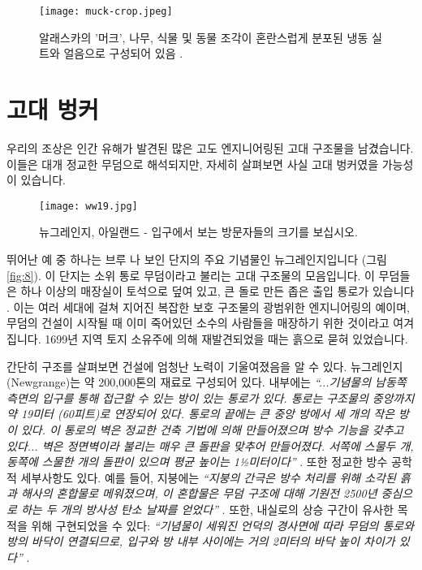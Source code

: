 \documentclass[10pt,twocolumn,letterpaper]{article}
\begin{document}
\begin{figure}[t]
\begin{center}
   \texttt{[image: muck-crop.jpeg]}
\end{center}
   \caption{알래스카의 '머크', 나무, 식물 및 동물 조각이 혼란스럽게 분포된 냉동 실트와 얼음으로 구성되어 있음 \cite{146}.}
\label{fig:7}
\label{fig:onecol}
\end{figure}

\section{고대 벙커}

우리의 조상은 인간 유해가 발견된 많은 고도 엔지니어링된 고대 구조물을 남겼습니다. 이들은 대개 정교한 무덤으로 해석되지만, 자세히 살펴보면 사실 고대 벙커였을 가능성이 있습니다.

\begin{figure}[b]
\begin{center}
   \texttt{[image: ww19.jpg]}
\end{center}
   \caption{뉴그레인지, 아일랜드 - 입구에서 보는 방문자들의 크기를 보십시오.}
\label{fig:8}
\label{fig:onecol}
\end{figure}

뛰어난 예 중 하나는 브루 나 보인 단지의 주요 기념물인 뉴그레인지입니다 (그림 \ref{fig:8}). 이 단지는 소위 통로 무덤이라고 불리는 고대 구조물의 모음입니다. 이 무덤들은 하나 이상의 매장실이 토석으로 덮여 있고, 큰 돌로 만든 좁은 출입 통로가 있습니다 \cite{70}. 이는 여러 세대에 걸쳐 지어진 복잡한 보호 구조물의 광범위한 엔지니어링의 예이며, 무덤의 건설이 시작될 때 이미 죽어있던 소수의 사람들을 매장하기 위한 것이라고 여겨집니다. 1699년 지역 토지 소유주에 의해 재발견되었을 때는 흙으로 묻혀 있었습니다.

간단히 구조를 살펴보면 건설에 엄청난 노력이 기울여졌음을 알 수 있다. 뉴그레인지(Newgrange)는 약 200,000톤의 재료로 구성되어 있다. 내부에는 \textit{“...기념물의 남동쪽 측면의 입구를 통해 접근할 수 있는 방이 있는 통로가 있다. 통로는 구조물의 중앙까지 약 19미터 (60피트)로 연장되어 있다. 통로의 끝에는 큰 중앙 방에서 세 개의 작은 방이 있다. 이 통로의 벽은 정교한 건축 기법에 의해 만들어졌으며 방수 기능을 갖추고 있다... 벽은 정면벽이라 불리는 매우 큰 돌판을 맞추어 만들어졌다. 서쪽에 스물두 개, 동쪽에 스물한 개의 돌판이 있으며 평균 높이는 1½미터이다”} \cite{70}. 또한 정교한 방수 공학적 세부사항도 있다. 예를 들어, 지붕에는 \textit{“지붕의 간극은 방수 처리를 위해 소각된 흙과 해사의 혼합물로 메워졌으며, 이 혼합물은 무덤 구조에 대해 기원전 2500년 중심으로 하는 두 개의 방사성 탄소 날짜를 얻었다”} \cite{71}. 또한, 내실로의 상승 구간이 유사한 목적을 위해 구현되었을 수 있다: \textit{“기념물이 세워진 언덕의 경사면에 따라 무덤의 통로와 방의 바닥이 연결되므로, 입구와 방 내부 사이에는 거의 2미터의 바닥 높이 차이가 있다”} \cite{71}.
\end{document}
